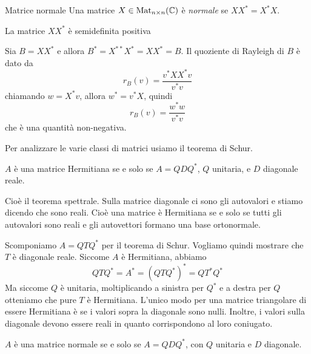 \documentclass[a4paper]{article}
\begin{document}
\begin{snippetdefinition}{Matrice normale}
    Una matrice \(X \in \operatorname{Mat}_{n \times n}(\mathbb{C})\)
    è \emph{normale} se \(XX^* = X^*X\).
\end{snippetdefinition}

\begin{snippetproposition}{}
    La matrice \(XX^*\) è semidefinita positiva
\end{snippetproposition}

\begin{snippetproof}{}
    Sia \(B = XX^*\) e allora \(B^* = X^{**} X^* = X X^* = B\).
    Il quoziente di Rayleigh di \(B\) è dato da
    \[
        r_B(v) = \frac{v^*XX^*v}{v^*v}
    \]
    chiamando \(w = X^*v\), allora \(w^* = v^* X\), quindi
    \[
        r_B(v) = \frac{w^*w}{v^*v}
    \]
    che è una quantità non-negativa.
\end{snippetproof}

Per analizzare le varie classi di matrici
usiamo il teorema di Schur.

\begin{snippettheorem}{}
    \(A\) è una matrice Hermitiana
    se e solo se \(A = QDQ^*\), \(Q\) unitaria, e \(D\) diagonale reale.
\end{snippettheorem}

Cioè il teorema spettrale.
Sulla matrice diagonale ci sono gli autovalori e stiamo dicendo che sono reali.
Cioè una matrice è Hermitiana se e solo se tutti gli autovalori sono reali
e gli autovettori formano una base ortonormale.

\begin{snippetproof}{}
    Scomponiamo \(A = QTQ^*\) per il teorema di Schur.
    Vogliamo quindi mostrare che \(T\) è diagonale reale.
    Siccome \(A\) è Hermitiana,
    abbiamo \[
        QTQ^* = A^* = (QTQ^*)^*
        = Q T^* Q^*
    \]
    Ma siccome \(Q\) è unitaria, moltiplicando a sinistra per \(Q^*\)
    e a destra per \(Q\) otteniamo che pure \(T\) è Hermitiana.
    L'unico modo per una matrice triangolare di essere Hermitiana è se i valori
    sopra la diagonale sono nulli. Inoltre,
    i valori sulla diagonale devono essere reali in quanto corrispondono al loro coniugato.
\end{snippetproof}

\begin{snippettheorem}{}
    \(A\) è una matrice normale
    se e solo se \(A = QDQ^*\), con \(Q\) unitaria e \(D\) diagonale.
\end{snippettheorem}
\end{document}
